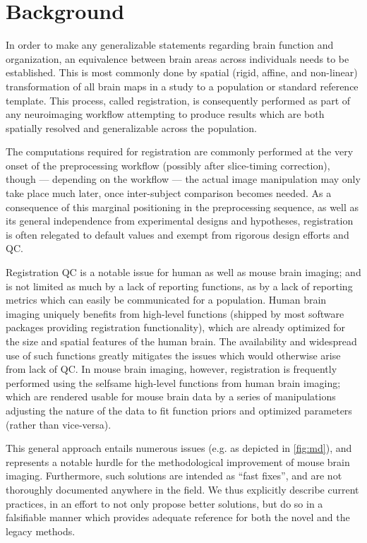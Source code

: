 \section{Background}
\label{sec:bg}

In order to make any generalizable statements regarding brain function and organization, an equivalence between brain areas across individuals needs to be established.
This is most commonly done by spatial (rigid, affine, and non-linear) transformation of all brain maps in a study to a population or standard reference template.
This process, called registration, is consequently performed as part of any neuroimaging workflow attempting to produce results which are both spatially resolved and generalizable across the population.

The computations required for registration are commonly performed at the very onset of the preprocessing workflow (possibly after slice-timing correction),
though --- depending on the workflow --- the actual image manipulation may only take place much later, once inter-subject comparison becomes needed.
As a consequence of this marginal positioning in the preprocessing sequence, as well as its general independence from experimental designs and hypotheses, registration is often relegated to default values and exempt from rigorous design efforts and QC.

Registration QC is a notable issue for human as well as mouse brain imaging;
and is not limited as much by a lack of reporting functions, as by a lack of reporting metrics which can easily be communicated for a population.
Human brain imaging uniquely benefits from high-level functions (shipped by most software packages providing registration functionality), which are already optimized for the size and spatial features of the human brain.
The availability and widespread use of such functions greatly mitigates the issues which would otherwise arise from lack of QC.
In mouse brain imaging, however, registration is frequently performed using the selfsame high-level functions from human brain imaging; which are rendered usable for mouse brain data by a series of manipulations adjusting the nature of the data to fit function priors and optimized parameters (rather than vice-versa).

This general approach entails numerous issues (e.g. as depicted in \cref{fig:md}), and represents a notable hurdle for the methodological improvement of mouse brain imaging.
Furthermore, such solutions are intended as “fast fixes”, and are not thoroughly documented anywhere in the field.
We thus explicitly describe current practices, in an effort to not only propose better solutions, but do so in a falsifiable manner which provides adequate reference for both the novel and the legacy methods.

